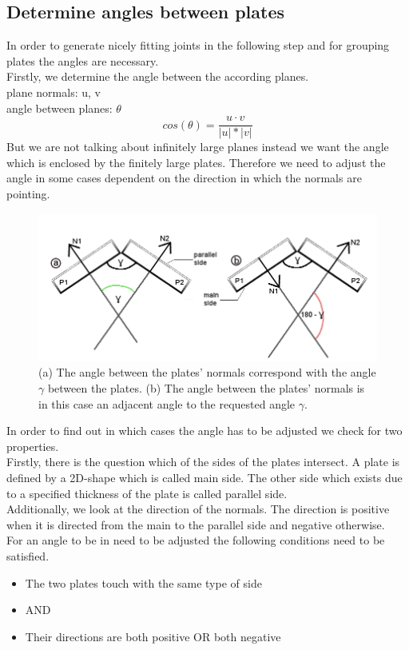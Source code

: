 \documentclass[../ClassicThesis.tex]{subfiles}
\begin{document}
\subsection{Determine angles between plates}
In order to generate nicely fitting joints in the following step and for grouping plates the angles are necessary.\\
Firstly, we determine the angle between the according planes.\\
plane normals: u, v\\
angle between planes: $\theta$
$$ cos(\theta) = \frac{u \cdot v}{|u| * |v|}$$
But we are not talking about infinitely large planes instead we want the angle which is enclosed by the finitely large plates. Therefore we need to adjust the angle in some cases dependent on the direction in which the normals are pointing.
\begin{figure}[h]

\includegraphics[width= 1\columnwidth]{Images/anglesExamplesSmall.png}
\caption{(a) The angle between the plates' normals correspond with the angle $\gamma$ between the plates. (b) The angle between the plates' normals is in this case an adjacent angle to the requested angle $\gamma$.}
\end{figure}

In order to find out in which cases the angle has to be adjusted we check for two properties.\\
Firstly, there is the question which of the sides of the plates intersect. A plate is defined by a 2D-shape which is called main side. The other side which exists due to a specified thickness of the plate is called parallel side.\\
Additionally, we look at the direction of the normals. The direction is positive when it is directed from the main to the parallel side and negative otherwise.\\
For an angle to be in need to be adjusted the following conditions need to be satisfied.
\begin{itemize}
    \item The two plates touch with the same type of side 
    \item[] AND
    \item Their directions are both positive OR both negative
\end{itemize}
\end{document}
